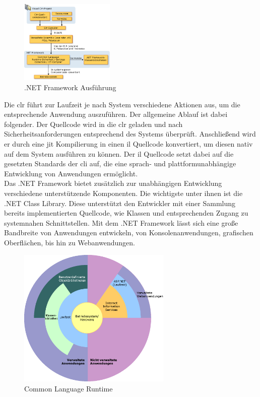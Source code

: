 \begin{figure}
	\begin{center}
		\includegraphics[width=0.4\textwidth]{images/technische_grundlagen/net_aufbau.jpeg}
	\end{center}
	\caption{.NET Framework Ausführung}
	\label{fig:net}
\end{figure}

\noindent
Die \gls{clr} führt zur Laufzeit je nach System verschiedene Aktionen aus, um die entsprechende Anwendung auszuführen. Der allgemeine Ablauf ist dabei folgender. Der Quellcode wird in die \gls{clr} geladen und nach Sicherheitsanforderungen entsprechend des Systems überprüft. Anschließend wird er durch eine \gls{jit} Kompilierung in einen \gls{il} Quellcode konvertiert, um diesen nativ auf dem System ausführen zu können. Der \gls{il} Quellcode setzt dabei auf die gesetzten Standards der \gls{cli} auf, die eine sprach- und plattformunabhängige Entwicklung von Anwendungen ermöglicht.\\
Das .NET Framework bietet zusätzlich zur unabhängigen Entwicklung verschiedene unterstützende Komponenten. Die wichtigste unter ihnen ist die .NET Class Library. Diese unterstützt den Entwickler mit einer Sammlung bereits implementierten Quellcode, wie Klassen und entsprechenden Zugang zu systemnahen Schnittstellen. Mit dem .NET Framework lässt sich eine große Bandbreite von Anwendungen entwickeln, von Konsolenanwendungen, grafischen Oberflächen, bis hin zu Webanwendungen.\\

\begin{figure}[h]
	\centering
	\includegraphics[width=0.65\textwidth]{images/technische_grundlagen/clr.png}
	\caption{Common Language Runtime}
	\label{fig:clr}
\end{figure}

